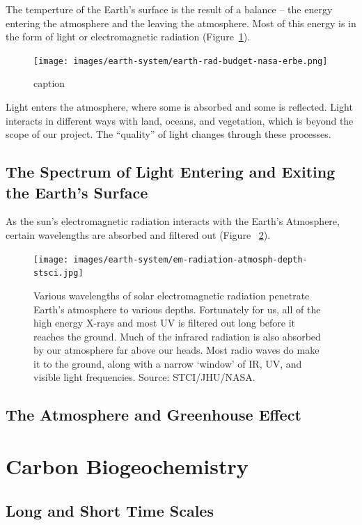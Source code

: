 \documentclass{book}\usepackage{knitr}
\begin{document}
The temperture of the Earth's surface is the result of a balance -- the energy entering the atmosphere and the leaving the atmosphere. Most of this energy is in the form of light or electromagnetic radiation (Figure~\ref{fig:earthbudget}). 

\begin{figure}
\texttt{[image: images/earth-system/earth-rad-budget-nasa-erbe.png]}
\caption{caption}
\label{fig:earthbudget}
\end{figure}

Light enters the atmosphere, where some is absorbed and some is reflected. Light interacts in different ways with land, oceans, and vegetation, which is beyond the scope of our project. The ``quality'' of light changes through these processes. 

\subsection{The Spectrum of Light Entering and Exiting the Earth's Surface}

As the sun's electromagnetic radiation interacts with the Earth's Atmosphere, certain wavelengths are absorbed and filtered out (Figure~ \ref{fig:em-entering}).

\begin{figure}
\texttt{[image: images/earth-system/em-radiation-atmosph-depth-stsci.jpg]}
\caption{Various wavelengths of solar electromagnetic radiation penetrate Earth's atmosphere to various depths. Fortunately for us, all of the high energy X-rays and most UV is filtered out long before it reaches the ground. Much of the infrared radiation is also absorbed by our atmosphere far above our heads. Most radio waves do make it to the ground, along with a narrow `window' of IR, UV, and visible light frequencies. Source: STCI/JHU/NASA.}
\label{fig:em-entering}
\end{figure}

\subsection{The Atmosphere and Greenhouse Effect}



\section{Carbon Biogeochemistry}

\subsection{Long and Short Time Scales}
\end{document}
